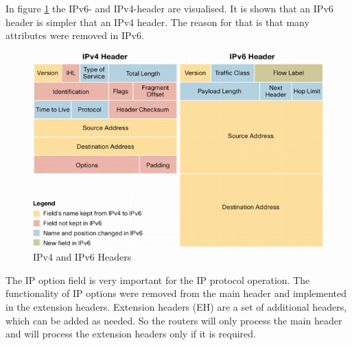 \documentclass[a4paper]{report}
\begin{document}
In figure \ref{fig:IPv4_IPv6_Header} the IPv6- and IPv4-header are visualised. It is shown that an IPv6 header is simpler that an IPv4 header. The reason for that is that many attributes were removed in IPv6.

\begin{figure}[htb]
	\centering
	\includegraphics[keepaspectratio,width=\linewidth]{ipv6_ipv4_headers}
	\caption {IPv4 and IPv6 Headers \parencite{cisco2006}}
	\label{fig:IPv4_IPv6_Header}
\end{figure}

The IP option field is very important for the IP protocol operation. The functionality of IP options were removed from the main header and implemented in the extension headers. Extension headers (EH) are a set of additional headers, which can be added as needed. So the routers will only process the main header and will process the extension headers only if it is required.
\end{document}
